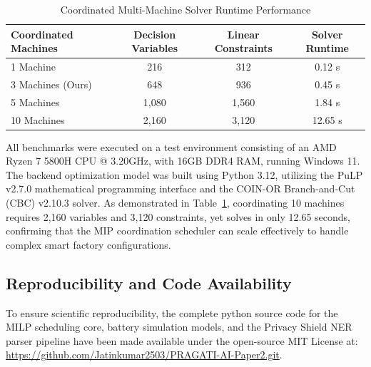 \documentclass[journal]{IEEEtran}
\begin{document}
\begin{table}[htbp]
\centering
\caption{Coordinated Multi-Machine Solver Runtime Performance}
\label{tab:runtime}
\begin{tabular}{lccc}
\toprule
\textbf{Coordinated Machines} & \textbf{Decision Variables} & \textbf{Linear Constraints} & \textbf{Solver Runtime} \\
\midrule
1 Machine & 216 & 312 & 0.12 s \\
3 Machines (Ours) & 648 & 936 & 0.45 s \\
5 Machines & 1,080 & 1,560 & 1.84 s \\
10 Machines & 2,160 & 3,120 & 12.65 s \\
\bottomrule
\end{tabular}
\end{table}

All benchmarks were executed on a test environment consisting of an AMD Ryzen 7 5800H CPU @ 3.20GHz, with 16GB DDR4 RAM, running Windows 11. The backend optimization model was built using Python 3.12, utilizing the PuLP v2.7.0 mathematical programming interface and the COIN-OR Branch-and-Cut (CBC) v2.10.3 solver. As demonstrated in Table~\ref{tab:runtime}, coordinating 10 machines requires 2,160 variables and 3,120 constraints, yet solves in only 12.65 seconds, confirming that the MIP coordination scheduler can scale effectively to handle complex smart factory configurations.

\subsection{Reproducibility and Code Availability}
To ensure scientific reproducibility, the complete python source code for the MILP scheduling core, battery simulation models, and the Privacy Shield NER parser pipeline have been made available under the open-source MIT License at: \url{https://github.com/Jatinkumar2503/PRAGATI-AI-Paper2.git}.
\end{document}
